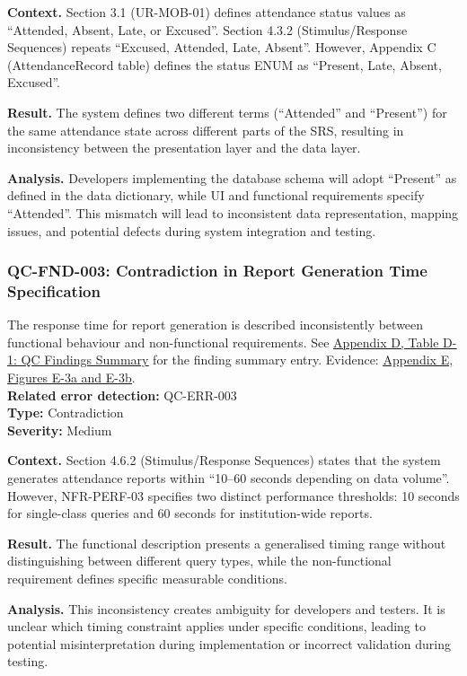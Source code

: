 \documentclass[11pt,a4paper]{article}
\let\orighyperref\hyperref
\renewcommand{\hyperref}[2][]{\orighyperref[#1]{\uline{#2}}}
\begin{document}
\textbf{Context.} Section 3.1 (UR-MOB-01) defines attendance status values as ``Attended, Absent, Late, or Excused''. Section 4.3.2 (Stimulus/Response Sequences) repeats ``Excused, Attended, Late, Absent''. However, Appendix C (AttendanceRecord table) defines the status ENUM as ``Present, Late, Absent, Excused''.

\textbf{Result.} The system defines two different terms (``Attended'' and ``Present'') for the same attendance state across different parts of the SRS, resulting in inconsistency between the presentation layer and the data layer.

\textbf{Analysis.} Developers implementing the database schema will adopt ``Present'' as defined in the data dictionary, while UI and functional requirements specify ``Attended''. This mismatch will lead to inconsistent data representation, mapping issues, and potential defects during system integration and testing.

\subsubsection*{QC-FND-003: Contradiction in Report Generation Time Specification}
The response time for report generation is described inconsistently between functional behaviour and non-functional requirements. See \hyperref[tab:qc-findings-summary]{Appendix D, Table D-1: QC Findings Summary} for the finding summary entry. Evidence: \hyperref[fig:evidence-003]{Appendix E, Figures E-3a and E-3b}. \\
\textbf{Related error detection:} QC-ERR-003 \\
\textbf{Type:} Contradiction \\
\textbf{Severity:} Medium

\textbf{Context.} Section 4.6.2 (Stimulus/Response Sequences) states that the system generates attendance reports within ``10--60 seconds depending on data volume''. However, NFR-PERF-03 specifies two distinct performance thresholds: 10 seconds for single-class queries and 60 seconds for institution-wide reports.

\textbf{Result.} The functional description presents a generalised timing range without distinguishing between different query types, while the non-functional requirement defines specific measurable conditions.

\textbf{Analysis.} This inconsistency creates ambiguity for developers and testers. It is unclear which timing constraint applies under specific conditions, leading to potential misinterpretation during implementation or incorrect validation during testing.
\end{document}
